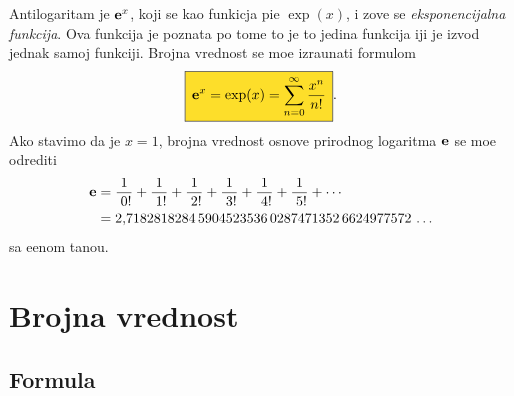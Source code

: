 \documentclass[12pt, twoside, a4paper]{article}
\def\.{\smash{,}\vphantom{.}}
\def\e{{\bf e}}
\def\okvir#1{\fcolorbox{black}{Goldenrod}{$\,\displaystyle{\mathstrut #1}\,$}}
\begin{document}
\def\ep{\hphantom{!}}
\def\rf#1!{\frac1{\hphantom{!}#1!}}
Antilogaritam je $\e^x$, koji se kao funkicja pi{\sv}e $\exp(x)$, i zove se
{\sl eksponencijalna funkcija}. Ova funkcija je poznata po tome {\sv}to je to 
jedina funkcija {\cv}iji je izvod jednak samoj funkciji. Brojna vrednost se mo{\zv}e
izra{\cv}unati formulom
\begin{equation}
\label{eq:exp}
\okvir{\e^x=\exp(x)=\sum_{n=0}^\infty\frac{x^n}{n!}}.
\end{equation}
Ako stavimo da je $x=1$,
brojna vrednost osnove prirodnog logaritma $\e$ se mo{\zv}e odrediti
\begin{equation}
\label{eq:e}
\begin{aligned}
\e
&=\rf0!+\rf1!+\rf2!+\rf3!+\rf4!+\rf5!+\cdots\\
&=2\.
7182818284\,
5904523536\,
0287471352\,
6624977572\,\ldots
\end{aligned}
\end{equation}
sa {\zv}e{\lj}enom ta{\cv}no{\sv}{\cc}u.


\section{Brojna vrednost}

\subsection{Formula}
\end{document}
